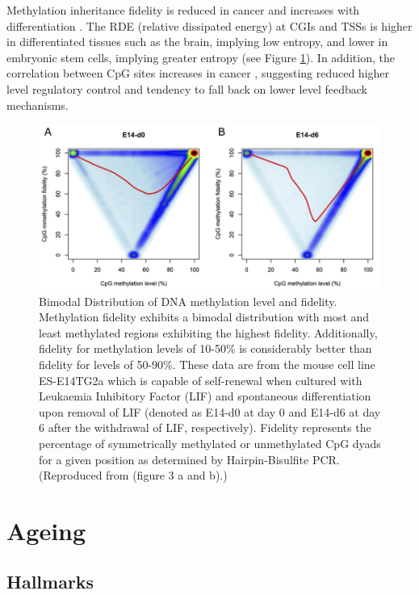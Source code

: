 \documentclass[]{book}
\begin{document}
Methylation inheritance fidelity is reduced in cancer \citep{Ushijima2005} and increases with differentiation \citep{Zhao2014}. The RDE (relative dissipated energy) at CGIs and TSSs is higher in differentiated tissues such as the brain, implying low entropy, and lower in embryonic stem cells, implying greater entropy \citep{Jenkinson2017} (see Figure \ref{fig:Zhao2014fig3ab}). In addition, the correlation between CpG sites increases in cancer \citep{Jenkinson2017}, suggesting reduced higher level regulatory control and tendency to fall back on lower level feedback mechanisms.

\begin{figure}
\includegraphics[width=12.76in]{figs/Zhao2014_fig3_a+b} \caption{Bimodal Distribution of DNA methylation level and fidelity.
Methylation fidelity exhibits a bimodal distribution with most and least methylated regions exhibiting the highest fidelity. Additionally, fidelity for methylation levels of 10-50\% is considerably better than fidelity for levels of 50-90\%. These data are from the mouse cell line ES-E14TG2a which is capable of self-renewal when cultured with Leukaemia Inhibitory Factor (LIF) and spontaneous differentiation upon removal of LIF (denoted as E14-d0 at day 0 and E14-d6 at day 6 after the withdrawal of LIF, respectively). Fidelity represents the percentage of symmetrically methylated or unmethylated CpG dyads for a given position as determined by Hairpin-Bisulfite PCR. (Reproduced from \citet{Zhao2014} (figure 3 a and b).)}\label{fig:Zhao2014fig3ab}
\end{figure}




\hypertarget{ageing}{%
\section{Ageing}\label{ageing}}

\hypertarget{hallmarks}{%
\subsection{Hallmarks}\label{hallmarks}}
\end{document}
